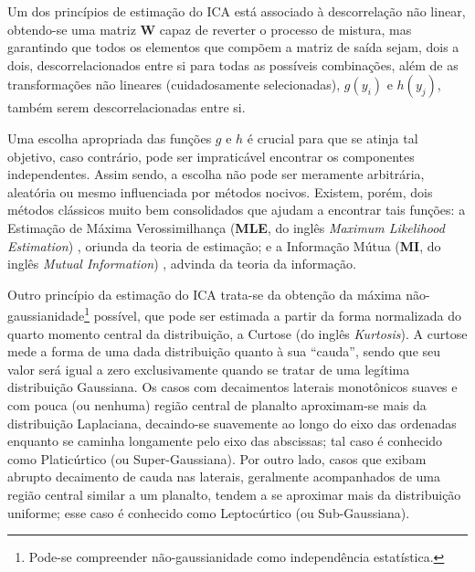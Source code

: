 Um dos princípios de estimação do ICA está associado à descorrelação não linear, obtendo-se uma matriz $\mathbf{W}$ capaz de reverter o processo de mistura, mas garantindo que todos os elementos que compõem a matriz de saída sejam, dois a dois, descorrelacionados entre si para todas as possíveis combinações, além de as transformações não lineares (cuidadosamente selecionadas), $g(y_{i})$ e $h(y_{j})$, também serem descorrelacionadas entre si.

Uma escolha apropriada das funções $g$ e $h$ é crucial para que se atinja tal objetivo, caso contrário, pode ser impraticável encontrar os componentes independentes. Assim sendo, a escolha não pode ser meramente arbitrária, aleatória ou mesmo influenciada por métodos nocivos. Existem, porém, dois métodos clássicos muito bem consolidados que ajudam a encontrar tais funções: a Estimação de Máxima Verossimilhança (\textbf{MLE}, do inglês \textit{Maximum Likelihood Estimation}) \citep{ra1922mathematical, aldrich1997ra}, oriunda da teoria de estimação; e a Informação Mútua (\textbf{MI}, do inglês \textit{Mutual Information}) \citep{cover2012elements}, advinda da teoria da informação.


Outro princípio da estimação do ICA trata-se da obtenção da máxima não-gaussianidade\footnote{Pode-se compreender não-gaussianidade como independência estatística.} possível, que pode ser estimada a partir da forma normalizada do quarto momento central da distribuição, a Curtose (do inglês \textit{Kurtosis}). A curtose mede a forma de uma dada distribuição quanto à sua ``cauda'', sendo que seu valor será igual a zero exclusivamente quando se tratar de uma legítima distribuição Gaussiana. Os casos com decaimentos laterais monotônicos suaves e com pouca (ou nenhuma) região central de planalto aproximam-se mais da distribuição Laplaciana, decaindo-se suavemente ao longo do eixo das ordenadas enquanto se caminha longamente pelo eixo das abscissas; tal caso é conhecido como Platicúrtico (ou Super-Gaussiana). Por outro lado, casos que exibam abrupto decaimento de cauda nas laterais, geralmente acompanhados de uma região central similar a um planalto, tendem a se aproximar mais da distribuição uniforme; esse caso é conhecido como Leptocúrtico (ou Sub-Gaussiana).\\

